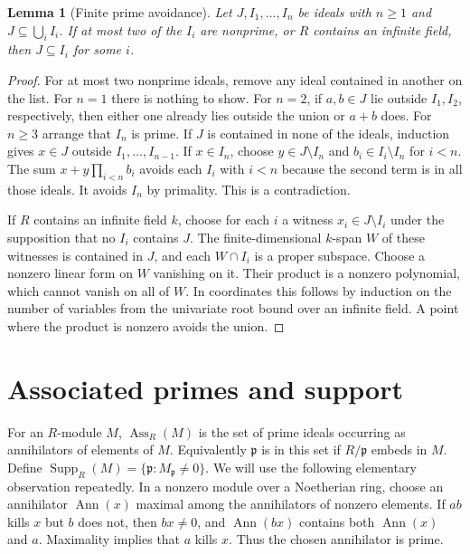 \documentclass[11pt,oneside,openany]{book}
\newtheorem{lemma}[theorem]{Lemma}
\theoremstyle{definition}
\theoremstyle{remark}
\begin{document}
\begin{lemma}[Finite prime avoidance]\label{p103:ALG-05-C02-S01}
Let \(J,I_1,\ldots,I_n\) be ideals with \(n\ge1\) and \(J\subseteq\bigcup_i I_i\). If at most two of the \(I_i\) are nonprime, or \(R\) contains an infinite field, then \(J\subseteq I_i\) for some \(i\).
\end{lemma}
\begin{proof}
For at most two nonprime ideals, remove any ideal contained in another on the list. For \(n=1\) there is nothing to show. For \(n=2\), if \(a,b\in J\) lie outside \(I_1,I_2\), respectively, then either one already lies outside the union or \(a+b\) does. For \(n\ge3\) arrange that \(I_n\) is prime. If \(J\) is contained in none of the ideals, induction gives \(x\in J\) outside \(I_1,\ldots,I_{n-1}\). If \(x\in I_n\), choose \(y\in J\setminus I_n\) and \(b_i\in I_i\setminus I_n\) for \(i<n\). The sum \(x+y\prod_{i<n}b_i\) avoids each \(I_i\) with \(i<n\) because the second term is in all those ideals. It avoids \(I_n\) by primality. This is a contradiction.

If \(R\) contains an infinite field \(k\), choose for each \(i\) a witness \(x_i\in J\setminus I_i\) under the supposition that no \(I_i\) contains \(J\). The finite-dimensional \(k\)-span \(W\) of these witnesses is contained in \(J\), and each \(W\cap I_i\) is a proper subspace. Choose a nonzero linear form on \(W\) vanishing on it. Their product is a nonzero polynomial, which cannot vanish on all of \(W\). In coordinates this follows by induction on the number of variables from the univariate root bound over an infinite field. A point where the product is nonzero avoids the union.
\end{proof}

\section{Associated primes and support}

For an \(R\)-module \(M\), \(\operatorname{Ass}_R(M)\) is the set of prime ideals occurring as annihilators of elements of \(M\). Equivalently \(\mathfrak p\) is in this set if \(R/\mathfrak p\) embeds in \(M\). Define \(\operatorname{Supp}_R(M)=\{\mathfrak p:M_{\mathfrak p}\ne0\}\). We will use the following elementary observation repeatedly. In a nonzero module over a Noetherian ring, choose an annihilator \(\operatorname{Ann}(x)\) maximal among the annihilators of nonzero elements. If \(ab\) kills \(x\) but \(b\) does not, then \(bx\ne0\), and \(\operatorname{Ann}(bx)\) contains both \(\operatorname{Ann}(x)\) and \(a\). Maximality implies that \(a\) kills \(x\). Thus the chosen annihilator is prime.
\end{document}
